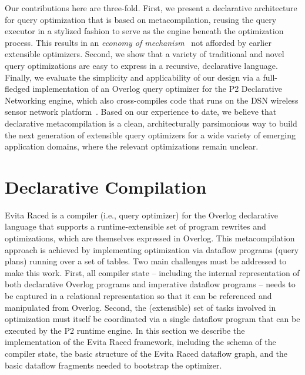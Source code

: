 Our contributions here are three-fold.  First, we present a declarative
architecture for query optimization that is based on metacompilation,
reusing the query executor in a stylized fashion to serve as the engine beneath 
the optimization process.  This results in an {\em economy of mechanism}~\cite{Saltzer75theprotection}
not afforded by earlier extensible optimizers. Second, we show that a variety of traditional and novel 
query optimizations are easy to express in a recursive, declarative language. Finally, 
we evaluate the simplicity and applicability of our design via a full-fledged implementation 
of an Overlog query optimizer for the P2 Declarative Networking engine, which also 
cross-compiles code that runs on the DSN wireless sensor network platform~\cite{chu-sensys07}.  
Based on our experience to date, we believe that declarative metacompilation is a clean,
architecturally parsimonious way to build the next generation of extensible query optimizers
for a wide variety of emerging application domains, where the relevant optimizations remain
unclear.

\section{Declarative Compilation}

Evita Raced is a compiler (i.e., query optimizer) for the Overlog
declarative language that supports a runtime-extensible set of program
rewrites and optimizations, which are themselves expressed in Overlog.
This metacompilation approach is achieved by implementing optimization
via dataflow programs  (query plans) running over a set of tables.  Two
main challenges must be addressed to make this work.  First, all
compiler state -- including the internal representation of both
declarative Overlog programs and imperative dataflow programs -- needs
to be captured in a relational representation so that it can be
referenced and manipulated from Overlog.  Second, the (extensible) set
of tasks involved in optimization must itself be coordinated via a
single dataflow program that can be executed by the P2 runtime engine.
In this section we describe the implementation of the Evita Raced
framework, including the schema of the compiler state, the basic
structure of the Evita Raced dataflow graph, and the basic dataflow
fragments needed to bootstrap the optimizer.

